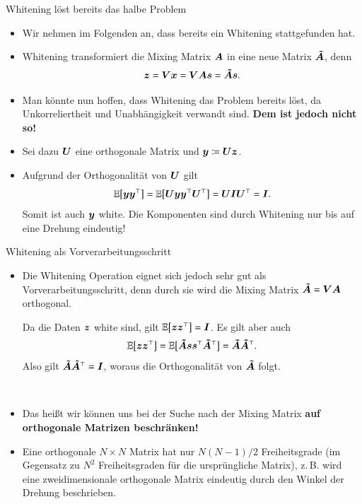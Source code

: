 \begin{frame}{Whitening löst bereits das halbe Problem}{}
	\begin{itemize}
		\item Wir nehmen im Folgenden an, dass bereits ein Whitening stattgefunden hat.
		\item Whitening transformiert die Mixing Matrix $\bm{A}$ in eine neue Matrix $\bm{\tilde{A}}$, denn
			$$\bm{z} = \bm{V} \bm{x} = \bm{V} \bm{A} \bm{s} = \bm{\tilde{A}} \bm{s}.$$
		\item Man könnte nun hoffen, dass Whitening das Problem bereits löst,
			da Unkorreliertheit und Unabhängigkeit verwandt sind. \textbf{Dem ist jedoch nicht so!}
		\item Sei dazu $\bm{U}$ eine orthogonale Matrix und $\bm{y} \coloneqq \bm{U} \bm{z}$.
		\item Aufgrund der Orthogonalität von $\bm{U}$ gilt
			$$\mathbb{E}\bigl[ \bm{y} \bm{y}^\top \bigr] = \mathbb{E}\bigl[ \bm{U} \bm{y} \bm{y}^\top \bm{U}^\top \bigr] = \bm{U} \bm{I} \bm{U}^\top = \bm{I}.$$
			Somit ist auch $\bm{y}$ white. Die Komponenten sind durch Whitening nur bis auf eine Drehung eindeutig!
	\end{itemize}
\end{frame}


\begin{frame}{Whitening als Vorverarbeitungsschritt}{}
	\begin{itemize}
		\item Die Whitening Operation eignet sich jedoch sehr gut als Vorverarbeitungsschritt,
			denn durch sie wird die Mixing Matrix $\bm{\tilde{A}} = \bm{V} \bm{A}$ orthogonal. \\ \vspace*{2mm}
		\begin{myproof}
			Da die Daten $\bm{z}$ white sind, gilt $\mathbb{E}\bigl[ \bm{z} \bm{z}^\top \bigr] = \bm{I}$. Es gilt aber auch
			\begin{equation*}
				\mathbb{E}\bigl[ \bm{z} \bm{z}^\top \bigr]
					= \mathbb{E}\bigl[ \bm{\tilde{A}} \bm{s} \bm{s}^\top \bm{\tilde{A}}^\top \bigr]
					= \bm{\tilde{A}} \bm{\tilde{A}}^\top.
			\end{equation*}
			Also gilt $\bm{\tilde{A}} \bm{\tilde{A}}^\top = \bm{I}$, woraus die Orthogonalität von $\bm{\tilde{A}}$ folgt.
		\end{myproof} \\ \vspace*{1mm}
		\item Das heißt wir können uns bei der Suche nach der Mixing Matrix \textbf{auf orthogonale Matrizen beschränken!}
		\item Eine orthogonale $N \times N$ Matrix hat nur $N (N - 1) / 2$ Freiheitsgrade
			(im Gegensatz zu $N^2$ Freiheitsgraden für die ursprüngliche Matrix),
			z.\,B. wird eine zweidimensionale orthogonale Matrix eindeutig durch den Winkel der Drehung beschrieben.
	\end{itemize}
\end{frame}


